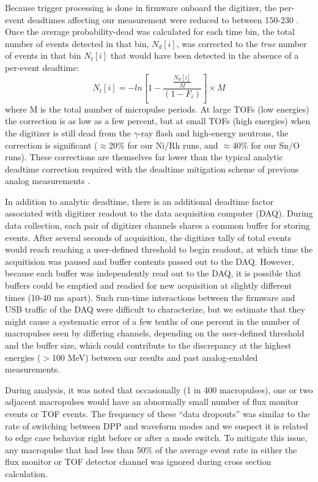 \documentclass[twocolumn,secnumarabic,amssymb, nobibnotes, aps, prl,
superscriptaddress, nobalancelastpage]{revtex4}
\begin{document}
Because trigger processing is done in firmware onboard the digitizer,
the per-event deadtimes affecting our
measurement were reduced to between 150-230 \nano\second.
Once the average probability-dead was calculated for each time bin,
the total number of
events detected in that bin, $N_{d}[i]$, was corrected to the \textit{true}
number of events in that bin $N_{t}[i]$ that would have been detected in the
absence of a per-event deadtime:
\begin{equation}
    N_{t}[i] = -ln\left[1-\frac{\frac{N_{d}[i]}{M}}{(1-F_{i})}\right]\times M
\end{equation}
where M is the total number of micropulse periods. At large TOFs (low energies) 
the correction is as low as a few percent,
but at small TOFs (high energies) when the digitizer is still dead
from the $\gamma$-ray flash and high-energy neutrons, the correction is 
significant ($\approx$20\% for our Ni/Rh runs, and $\approx$40\% for
our Sn/O runs). These 
corrections are themselves far lower than the typical
analytic deadtime correction required with the deadtime mitigation scheme of
previous analog measurements \cite{Finlay1993,
Abfalterer2001}. %

In addition to analytic deadtime, there is an additional deadtime factor associated with 
digitizer readout to the data acquisition computer (DAQ). During data
collection, each pair of digitizer channels shares a common buffer for storing events.
After several seconds of acquisition, the digitizer tally of total events would
reach reaching a user-defined threshold to begin readout, at which time the
acquitision was paused and buffer contents passed out to the DAQ. However,
because each buffer was independently read out to the DAQ, it is possible that buffers
could be emptied and readied for new acquisition at slightly different times
(10-40 ms apart). Such run-time interactions between the firmware and USB
traffic of the DAQ were difficult to characterize, but we estimate that they might cause a 
systematic error of a few tenths of one
percent in the number of macropulses seen by differing channels, depending on the user-defined 
threshold and the buffer size, which could contribute to the discrepancy at the
highest energies ($>$100 MeV) between our results and past analog-enabled
measurements. 

During analysis, it was noted that occasionally (1 in 400 macropulses), one or two 
adjacent macropulses would have an abnormally small number of flux monitor events or 
TOF events. The frequency of these ``data dropouts'' was similar to the rate of
switching between DPP and waveform modes and we suspect it is related to edge
case behavior right before or after a mode switch. To mitigate this issue,
any macropulse that had less than 50\% of the average event rate in either the
flux monitor or TOF detector channel was ignored during cross section calculation.
\end{document}
